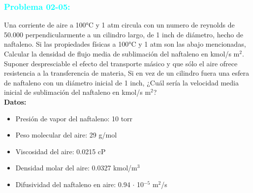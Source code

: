 \documentclass{report}
\begin{document}
\subsubsection{\textbf{\textcolor{cyan}{Problema 02-05:}}}
\begin{raggedright}
	Una corriente de aire a 100°C y 1 atm circula con un numero de reynolds de 50.000 perpendicularmente a un cilindro largo,
	de 1 inch de diámetro, hecho de naftaleno. Si las propiedades físicas a 100°C y 1 atm son las abajo mencionadas, Calcular
	la densidad de flujo media de sublimación del naftaleno en kmol/s m$^2$. Suponer despresciable el efecto del transporte másico
	y que sólo el aire ofrece resistencia a la transferencia de materia, Si en vez de un cilindro fuera una esfera de naftaleno con un diámetro
	inicial de 1 inch, ¿Cuál sería la velocidad media inicial de sublimación del naftaleno en kmol/s m$^2$?\\
	\vspace{1\baselineskip}
	\textbf{Datos:}
	\begin{itemize}
		\item [] Presión de vapor del naftaleno: 10 torr
		\item [] Peso molecular del aire: 29 g/mol
		\item [] Viscosidad del aire: 0.0215 cP
		\item [] Densidad molar del aire: 0.0327 kmol/m$^3$
		\item [] Difusividad del naftaleno en aire: 0.94 $\cdot$ 10$^{-5}$ m$^2$/s
	\end{itemize}

\end{raggedright}
\end{document}
